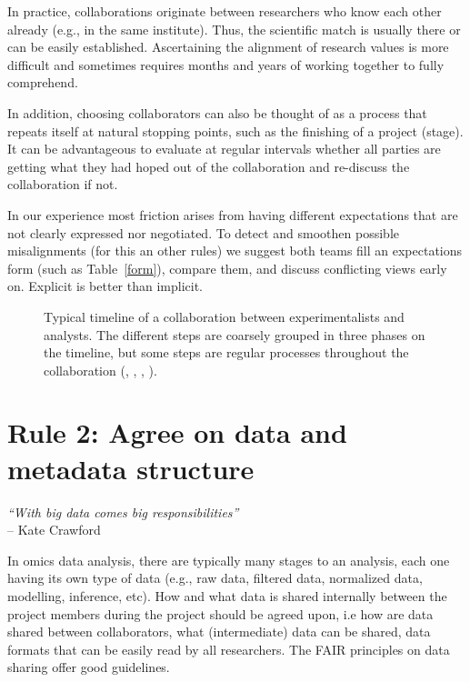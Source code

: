 \documentclass{article}
\begin{document}
In practice, collaborations originate between researchers who know each other already (e.g., in the same institute). Thus, the scientific match is usually there or can be easily established. Ascertaining the alignment of research values is more difficult and sometimes requires months and years of working together to fully comprehend. 

In addition, choosing collaborators can also be thought of as a process that repeats itself at natural stopping points, such as the finishing of a project (stage). It can be advantageous to evaluate at regular intervals whether all parties are getting what they had hoped out of the collaboration and re-discuss the collaboration if not.

In our experience most friction arises from having different expectations that are not clearly expressed nor negotiated. To detect and smoothen possible misalignments (for this an other rules) we suggest both teams fill an expectations form (such as Table~\ref{form}), compare them, and discuss conflicting views early on. Explicit is better than implicit. 

\begin{figure}
  \centering
  \fbox{\rule[-.5cm]{4cm}{4cm} \rule[-.5cm]{4cm}{0cm}}
  \caption{Typical timeline of a collaboration between experimentalists and analysts. The different steps are coarsely grouped in three phases on the timeline, but some steps are regular processes throughout the collaboration (, , , ).}
  \label{fig:figure1}
\end{figure}

\section*{Rule 2: Agree on data and metadata structure} %
\label{rule2_data}

\begin{flushright}
\rightskip=1cm\textit{``With big data comes big responsibilities''} \\
\vspace{.2em}
\rightskip=0cm -- Kate Crawford
\end{flushright}

In omics data analysis, there are typically many stages to an analysis, each one having its own type of data (e.g., raw data, filtered data, normalized data, modelling, inference, etc). How and what data is shared internally between the project members during the project should be agreed upon, i.e how are data shared between collaborators, what (intermediate) data can be shared, data formats that can be easily read by all researchers. The FAIR principles\cite{wilkinson2016fair} on data sharing offer good guidelines.
\end{document}
